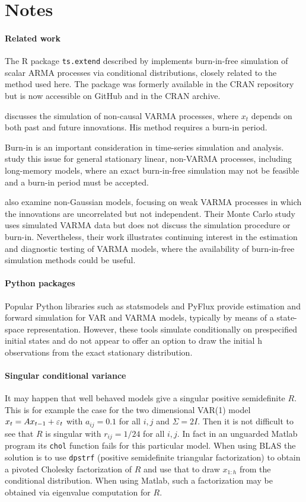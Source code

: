 \documentclass[a4paper,12pt]{extarticle} %
\begin{document}
\section{Notes}
\paragraph{Related work} The R package \texttt{ts.extend} described by
\citet{oneill2021tsextend} implements burn-in-free simulation of scalar ARMA
processes via conditional distributions, closely related to the method used
here. The package was formerly available in the CRAN repository but is now
accessible on GitHub and in the CRAN archive.

\citet{giurcanu2015noncausal} discusses the simulation of non-causal VARMA processes,
where $x_t$ depends on both past and future innovations. His method requires a
burn-in period.

Burn-in is an important consideration in time-series simulation and analysis.
\citet{li2024burnin} study this issue for general stationary linear, non-VARMA
processes, including long-memory models, where an exact burn-in-free simulation
may not be feasible and a burn-in period must be accepted.

\citet{boubacar2024varma} also examine non-Gaussian models, focusing on weak
VARMA processes in which the innovations are uncorrelated but not independent.
Their Monte Carlo study uses simulated VARMA data but does not discuss the
simulation procedure or burn-in. Nevertheless, their work illustrates continuing
interest in the estimation and diagnostic testing of VARMA models, where the
availability of burn-in-free simulation methods could be useful.

\paragraph{Python packages} Popular Python libraries such as statsmodels and
PyFlux provide estimation and forward simulation for VAR and VARMA models,
typically by means of a state-space representation. However, these tools
simulate conditionally on prespecified initial states and do not appear to offer
an option to draw the initial h observations from the exact stationary
distribution.

\paragraph{Singular conditional variance}
It may happen that well behaved models give a singular positive semidefinite
$R$. This is for example the case for the two dimensional VAR(1) model $x_t = A
x_{t-1} + \varepsilon_t$ with $a_{ij} = 0.1$ for all $i,j$ and $\Sigma = 2I$.
Then it is not difficult to see that $R$ is singular with $r_{ij} = 1/24$ for
all $i,j$. In fact in an unguarded Matlab program its \texttt{chol} function
fails for this particular model. When using BLAS the solution is to use
\texttt{dpstrf} (positive semidefinite triangular factorization) to obtain
a pivoted Cholesky factorization of $R$ and use that to draw $x_{1:h}$ from
the conditional distribution. When using Matlab, such a factorization may be
obtained via eigenvalue computation for $R$.
\end{document}
